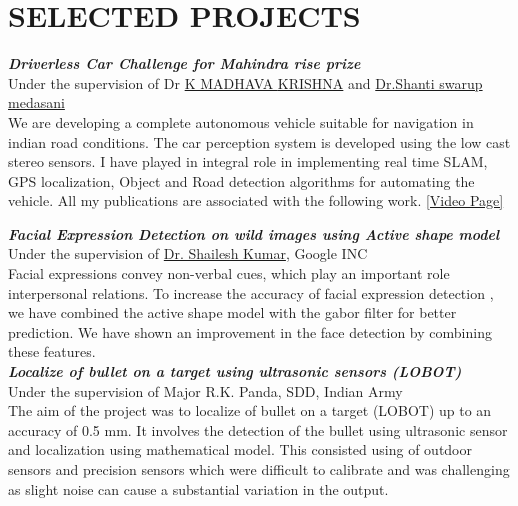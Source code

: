 \documentclass[a4paper,10pt]{article}
\begin{document}
 \section{SELECTED PROJECTS} 
 {\sl \textbf{Driverless Car Challenge for Mahindra rise prize}}\\
 Under the supervision of Dr \href{https://www.iiit.ac.in/people/faculty/mkrishna/} {K MADHAVA \textsc{KRISHNA}} and \href{https://www.linkedin.com/in/shanthi-swaroop-e-1b953527}{Dr.Shanti swarup medasani}  \\
 We are developing a complete autonomous vehicle suitable for navigation in indian road conditions. The car perception system is developed using the low cast stereo sensors. I have played in integral role in implementing real time SLAM, GPS localization, Object and Road detection algorithms for automating the vehicle. All my publications are associated with the following work. \href{https://www.youtube.com/playlist?list=PLemkgppNt5fqMpV24R32fbYjRsfz-Fjgm} {[Video Page]} 
 
{\sl \textbf{Facial Expression Detection on wild images using Active shape model}}\\
Under the supervision of \href{http://research.google.com/pubs/ShaileshKumar.html}{Dr. Shailesh Kumar}, Google INC  \\
Facial expressions convey non-verbal cues, which play an important role interpersonal relations. To increase the accuracy of facial expression detection , we have combined the active shape model with the gabor filter for better prediction. We have shown an improvement in the face detection by combining these features.\\


  {\sl \textbf{Localize of bullet on a target using ultrasonic sensors (LOBOT)}}\\
  Under the supervision of Major R.K. Panda, SDD, Indian Army\\
The aim of the project was to localize of bullet on a target (LOBOT) up to an
accuracy of 0.5 mm. It involves the detection of the bullet using ultrasonic
sensor and localization using mathematical model. This consisted using of
outdoor sensors and precision sensors which were difficult to calibrate and was
challenging as slight noise can cause a substantial variation in the output.
\end{document}
